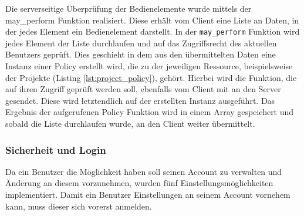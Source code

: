 Die serverseitige Überprüfung der Bedienelemente wurde mittels der may\_perform Funktion realisiert. Diese erhält vom Client eine Liste an Daten, in der jedes Element ein Bedienelement darstellt. In der \texttt{may\_perform} Funktion wird jedes Element der Liste durchlaufen und auf das Zugriffsrecht des aktuellen Benutzers geprüft. Dies geschieht in dem aus den übermittelten Daten eine Instanz einer Policy erstellt wird, die zu der jeweiligen Ressource, beispielsweise der Projekte (Listing \ref{lst:project_policy}), gehört. Hierbei wird die Funktion, die auf ihren Zugriff geprüft werden soll, ebenfalls vom Client mit an den Server gesendet. Diese wird letztendlich auf der erstellten Instanz ausgeführt. Das Ergebnis der aufgerufenen Policy Funktion wird in einem Array gespeichert und sobald die Liste durchlaufen wurde, an den Client weiter übermittelt.

\subsubsection{Sicherheit und Login}
\label{sec:server-account-settings}
Da ein Benutzer die Möglichkeit haben soll seinen Account zu verwalten und Änderung an diesem vorzunehmen, wurden fünf Einstellungsmöglichkeiten implementiert. Damit ein Benutzer Einstellungen an seinem Account vornehem kann, muss dieser sich vorerst anmelden.

